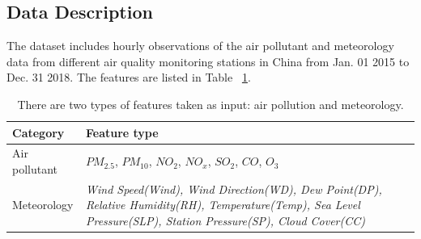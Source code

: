 \subsection{Data Description}
\label{section:datadescription}

The dataset includes hourly observations of the air pollutant and meteorology data from different air quality monitoring stations in China from Jan. 01 2015 to Dec. 31 2018.
The features are listed in Table ~\ref{table:feature_list}.

\begin{table}[h!]
\centering
\caption{There are two types of features taken as input: air pollution and meteorology. }
\begin{tabular}{|p{2cm}|p{5.2cm}|} 
\hline
 Category & Feature type \\ [0.5ex] 
\hline
    Air pollutant&$PM_{2.5}$, $PM_{10}$, $NO_{2}$, $NO_{x}$, $SO_{2}$, $CO$, $O_3$\\[0.4ex] 
\hline
    Meteorology&\textit{Wind Speed(Wind), Wind Direction(WD), Dew Point(DP), Relative Humidity(RH), Temperature(Temp), Sea Level Pressure(SLP), Station Pressure(SP), Cloud Cover(CC)}\\
\hline
\end{tabular}
\label{table:feature_list}
\end{table}

